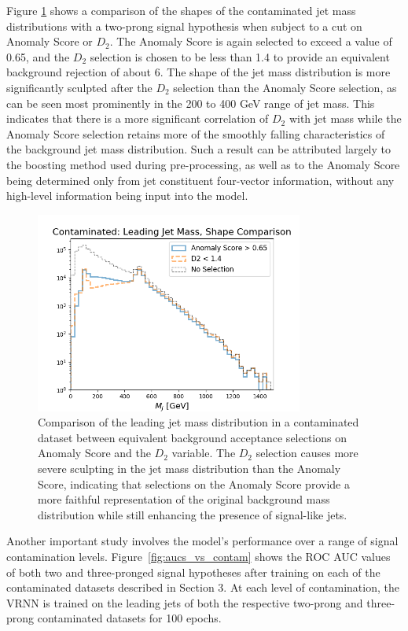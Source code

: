 \documentclass[11pt, a4paper]{article}
\begin{document}
Figure \ref{fig:d2_comp} shows a comparison of the shapes of the contaminated jet mass distributions with a two-prong signal hypothesis when subject to a cut on Anomaly Score or $D_2$. The Anomaly Score is again selected to exceed a value of 0.65, and the $D_2$ selection is chosen to be less than 1.4 to provide an equivalent background rejection of about 6. The shape of the jet mass distribution is more significantly sculpted after the $D_2$ selection than the Anomaly Score selection, as can be seen most prominently in the 200 to 400 GeV range of jet mass. This indicates that there is a more significant correlation of $D_2$ with jet mass while the Anomaly Score selection retains more of the smoothly falling characteristics of the background jet mass distribution. Such a result can be attributed largely to the boosting method used during pre-processing, as well as to the Anomaly Score being determined only from jet constituent four-vector information, without any high-level information being input into the model. 

\begin{figure}[H]
	\begin{center}
		\includegraphics[width=250pt]{imgs/bugfix/2Prong_Contaminated_10p0_J_Mass_EventScore0p65_Multi_D2Comp_Lead_SaveForPaper.png}
	\end{center}
	\caption{Comparison of the leading jet mass distribution in a contaminated dataset between equivalent background acceptance selections on Anomaly Score and the $D_2$ variable. The $D_2$ selection causes more severe sculpting in the jet mass distribution than the Anomaly Score, indicating that selections on the Anomaly Score provide a more faithful representation of the original background mass distribution while still enhancing the presence of signal-like jets.}
	\label{fig:d2_comp}
\end{figure}


Another important study involves the model's performance over a range of signal contamination
levels. Figure~\ref{fig:aucs_vs_contam} shows the ROC AUC values of both two and three-pronged signal hypotheses
after training on each of the contaminated datasets described in Section 3. 
At each level of contamination, the VRNN is trained on the leading jets of both the respective two-prong and three-prong contaminated datasets for 100 epochs. 
\end{document}
